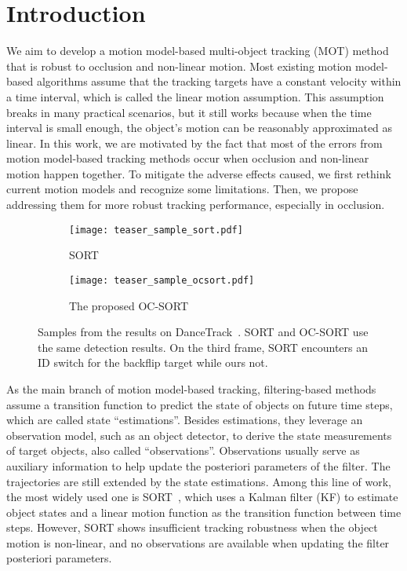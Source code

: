 \documentclass[10pt,twocolumn,letterpaper]{article}
\newcommand{\citnum}[1]{\citep{#1}}
\begin{document}
\section{Introduction}
We aim to develop a motion model-based multi-object tracking (MOT) method that is robust to occlusion and non-linear motion.
Most existing motion model-based algorithms assume that the tracking targets have a constant velocity within a time interval, which is called the linear motion assumption. 
This assumption breaks in many practical scenarios, but it still works because when the time interval is small enough, the object's motion can be reasonably approximated as linear.
In this work, we are motivated by the fact that most of the errors from motion model-based tracking methods occur when occlusion and non-linear motion happen together.
To mitigate the adverse effects caused, we first rethink current motion models and recognize some limitations. Then, we propose addressing them for more robust tracking performance, especially in occlusion.

\begin{figure}[t]
  \begin{subfigure}{.98\linewidth}
    \centering
    \texttt{[image: teaser\_sample\_sort.pdf]}
    \caption{SORT}
  \end{subfigure}
  \hfill
  \begin{subfigure}{.98\linewidth}
    \centering
    \texttt{[image: teaser\_sample\_ocsort.pdf]}
    \caption{The proposed OC-SORT}
  \end{subfigure}
  \caption{Samples from the results on DanceTrack~\cite{sun2021dancetrack}. SORT and OC-SORT use the same detection results. On the third frame, SORT encounters an ID switch for the backflip target while ours not. }
  \label{fig:teaser}
\end{figure}

As the main branch of motion model-based tracking, filtering-based methods assume a transition function to predict the state of objects on future time steps, which are called state ``estimations''. Besides estimations, they leverage an observation model, such as an object detector, to derive the state measurements of target objects, also called ``observations''. Observations usually serve as auxiliary information to help update the posteriori parameters of the filter. 
The trajectories are still extended by the state estimations. Among this line of work, the most widely used one is SORT~\citnum{bewley2016simple}, which uses a Kalman filter (KF) to estimate object states and a linear motion function as the transition function between time steps. However, SORT shows insufficient tracking robustness when the object motion is non-linear, and no observations are available when updating the filter posteriori parameters.
\end{document}
